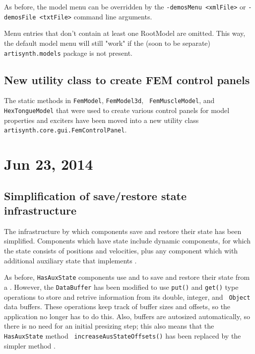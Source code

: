 \documentclass{article}
\begin{document}
As before, the model menu can be overridden by the 
{\tt -demosMenu <xmlFile>} or
{\tt -demosFile <txtFile>} command line arguments.

Menu entries that don't contain at least one RootModel are omitted.
This way, the default model menu will still "work" if the (soon to be
separate) {\tt artisynth.models} package is not present.

\subsection*{New utility class to create FEM control panels}

The static methods in {\tt FemModel}, {\tt FemModel3d}, {\tt
FemMuscleModel}, and {\tt HexTongueModel} that were used to create
various control panels for model properties and exciters have been
moved into a new utility class 
{\tt artisynth.core.gui.FemControlPanel}.

\section*{Jun 23, 2014}

\subsection*{Simplification of save/restore state infrastructure}

The infrastructure by which components save and restore their state
has been simplified. Components which have state include dynamic
components, for which the state consists of positions and velocities,
plus any component which with additional auxiliary state that
implements .

As before, {\tt HasAuxState} components use
 and
 to save
and restore their state from a
. However, the {\tt DataBuffer}
has been modified to use {\tt put()} and {\tt get()} type operations
to store and retrive information from its double, integer, and {\tt
Object} data buffers. These operations keep track of buffer sizes and
offsets, so the application no longer has to do this. Also, buffers
are autosized automatically, so there is no need for an initial
presizing step; this also means that the {\tt HasAuxState} method {\tt
increaseAusStateOffsets()} has been replaced by the simpler method
.
\end{document}

